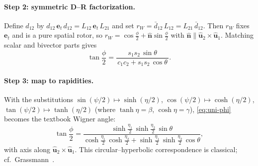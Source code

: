\documentclass[11pt]{article}
\numberwithin{equation}{section}
\providecommand{\uhat}{\hat{\mathbf u}}
\begin{document}
\paragraph{Step 2: symmetric D--R factorization.}
Define $d_{12}$ by $d_{12}\,\mathbf e_t\, d_{12}=L_{12}\,\mathbf e_t\, L_{21}$ and set
$r_W=\bar d_{12}\,L_{12}=L_{21}\,\bar d_{12}$. Then $r_W$ fixes $\mathbf e_t$ and is a pure spatial
rotor, so $r_W=\cos\frac{\phi}{2}+\hat{\mathbf n}\sin\frac{\phi}{2}$ with
$\hat{\mathbf n}\parallel \uhat_2\times\uhat_1$. Matching scalar and bivector parts gives
\begin{equation}
\tan\frac{\phi}{2}=
\frac{s_1 s_2\,\sin\theta}{\,c_1 c_2+s_1 s_2\,\cos\theta\,}.
\label{eq:uni-phi}
\end{equation}

\paragraph{Step 3: map to rapidities.}
With the substitutions $\sin(\psi/2)\mapsto\sinh(\eta/2)$, $\cos(\psi/2)\mapsto\cosh(\eta/2)$,
$\tan(\psi/2)\mapsto\tanh(\eta/2)$ (where $\tanh\eta=\beta$, $\cosh\eta=\gamma$), \eqref{eq:uni-phi}
becomes the textbook Wigner angle:
\begin{equation}
\tan\frac{\phi}{2}
=\frac{\sinh\frac{\eta_1}{2}\,\sinh\frac{\eta_2}{2}\,\sin\theta}
{\cosh\frac{\eta_1}{2}\,\cosh\frac{\eta_2}{2}+\sinh\frac{\eta_1}{2}\,\sinh\frac{\eta_2}{2}\,\cos\theta},
\end{equation}
with axis along $\uhat_2\times\uhat_1$. This circular--hyperbolic correspondence is classical; cf.\ Grassmann~\cite{Grassmann1844}.
\end{document}
